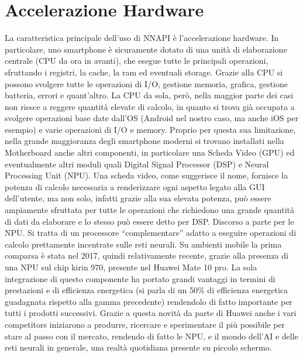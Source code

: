 \section{Accelerazione Hardware}
La caratteristica principale dell’uso di NNAPI è l’accelerazione hardware. In particolare, uno smartphone è sicuramente dotato di una unità di elaborazione
centrale (CPU da ora in avanti), che esegue tutte le principali operazioni, sfruttando i registri, la cache, la ram ed eventuali storage. Grazie alla CPU
si possono svolgere tutte le operazioni di I/O, gestione memoria, grafica, gestione batteria, errori e quant’altro.
La CPU da sola, però, nella maggior parte dei casi non riesce a reggere quantità elevate di calcolo, in quanto si trova già occupata a svolgere operazioni
base date dall’OS (Android nel nostro caso, ma anche iOS per esempio) e varie operazioni di I/O e memory. Proprio per questa sua limitazione, nella grande
maggioranza degli smartphone moderni si trovano installati nella Motherboard anche altri componenti, in particolare una Scheda Video (GPU) ed eventualmente
altri moduli quali Digital Signal Processor (DSP) e Neural Processing Unit (NPU). 
Una scheda video, come suggerisce il nome, fornisce la potenza di calcolo necessaria a renderizzare ogni aspetto legato alla GUI dell’utente, ma non solo,
infatti grazie alla sua elevata potenza, può essere ampiamente sfruttata per tutte le operazioni che richiedono una grande quantità di dati da elaborare e
lo stesso può essere detto per DSP. 
Discorso a parte per le NPU. Si tratta di un processore “complementare” adatto a eseguire operazioni di calcolo prettamente incentrate sulle reti neurali.
Su ambienti mobile la prima comparsa è stata nel 2017, quindi relativamente recente, grazie alla presenza di una NPU sul chip kirin 970, presente nel Huawei
Mate 10 pro.
La sola integrazione di questo componente ha portato grandi vantaggi in termini di prestazioni e di efficienza energetica (si parla di un 50\% di efficienza
energetica guadagnata rispetto alla gamma precedente) rendendolo di fatto importante per tutti i prodotti successivi. Grazie a questa novità da parte di
Huawei anche i vari competitors iniziarono a produrre, ricercare e sperimentare il più possibile per stare al passo con il mercato, rendendo di fatto le NPU,
e il mondo dell’AI e delle reti neurali in generale, una realtà quotidiana presente su piccolo schermo.

